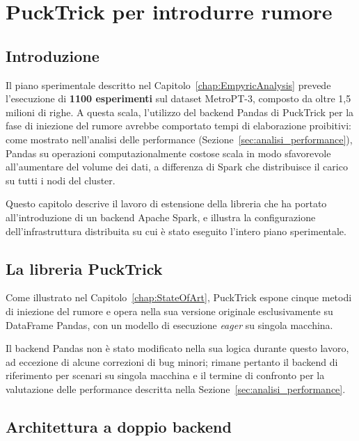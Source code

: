 \documentclass[../main.tex]{subfiles}
\begin{document}
\chapter{PuckTrick per introdurre rumore}
\label{chap:DesignAndImplementation} 

\section{Introduzione}

Il piano sperimentale descritto nel Capitolo~\ref{chap:EmpyricAnalysis} prevede l'esecuzione di \textbf{1100 esperimenti} sul dataset MetroPT-3, composto da oltre 1,5 milioni di righe. A questa scala, l'utilizzo del backend Pandas di PuckTrick per la fase di iniezione del rumore avrebbe comportato tempi di elaborazione proibitivi: come mostrato nell'analisi delle performance (Sezione~\ref{sec:analisi_performance}), Pandas su operazioni computazionalmente costose scala in modo sfavorevole all'aumentare del volume dei dati, a differenza di Spark che distribuisce il carico su tutti i nodi del cluster.

Questo capitolo descrive il lavoro di estensione della libreria che ha portato all'introduzione di un backend Apache Spark, e illustra la configurazione dell'infrastruttura distribuita su cui è stato eseguito l'intero piano sperimentale.


\section{La libreria PuckTrick}
\label{sec:pucktrick_originale}

Come illustrato nel Capitolo~\ref{chap:StateOfArt}, PuckTrick espone cinque metodi di iniezione del rumore e opera nella sua versione originale esclusivamente su DataFrame Pandas, con un modello di esecuzione \textit{eager} su singola macchina.

Il backend Pandas non è stato modificato nella sua logica durante questo lavoro, ad eccezione di alcune correzioni di bug minori; rimane pertanto il backend di riferimento per scenari su singola macchina e il termine di confronto per la valutazione delle performance descritta nella Sezione~\ref{sec:analisi_performance}.

\section{Architettura a doppio backend}
\label{sec:architettura_backend}
\end{document}
